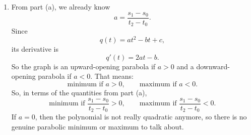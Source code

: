 \documentclass[10pt]{extarticle}
\begin{document}
\begin{enumerate}[label=(\alph*)]
\[\begin{array}{ccc|c}
t_1+t_0 & -1 & 0 & s_0\\[0.4em]
t_2+t_1 & -1 & 0 & s_1
\end{array}
\right).
\]
Now, subtract the second row from the third:
\[
R_3\leftarrow R_3-R_2.
\]
Then,
\[
\left(
\begin{array}{ccc|c}
t_0^2 & -t_0 & 1 & y_0\\
t_1+t_0 & -1 & 0 & s_0\\[0.4em]
t_2-t_0 & 0 & 0 & s_1-s_0
\end{array}
\right).
\]
Now, divide the third row by $t_2-t_0$:
\[
R_3\leftarrow \frac{1}{t_2-t_0}R_3.
\]
This gives
\[
\left(
\begin{array}{ccc|c}
t_0^2 & -t_0 & 1 & y_0\\
t_1+t_0 & -1 & 0 & s_0\\[0.4em]
1 & 0 & 0 & \dfrac{s_1-s_0}{t_2-t_0}
\end{array}
\right).
\]
So we can already read off
\[
a=\frac{s_1-s_0}{t_2-t_0}.
\]
Next, eliminate the $a$-entry from the second row:
\[
R_2\leftarrow R_2-(t_1+t_0)R_3.
\]
Then,
\[
\left(
\begin{array}{ccc|c}
t_0^2 & -t_0 & 1 & y_0\\
0 & -1 & 0 & s_0-(t_1+t_0)a\\[0.4em]
1 & 0 & 0 & a
\end{array}
\right).
\]
Finally, multiply the second row by $-1$:
\[
R_2\leftarrow -R_2,
\]
so
\[
\left(
\begin{array}{ccc|c}
t_0^2 & -t_0 & 1 & y_0\\
0 & 1 & 0 & (t_1+t_0)a-s_0\\[0.4em]
1 & 0 & 0 & a
\end{array}
\right).
\]
Thus,
\[
b=(t_1+t_0)a-s_0.
\]
If we let
\[
m_0=\frac{t_0+t_1}{2},
\qquad
m_1=\frac{t_1+t_2}{2},
\]
then this is the same as
\[
b=2am_0-s_0=2am_1-s_1.
\]
To get $c$, eliminate the $a$ and $b$ entries from the first row:
\[
R_1\leftarrow R_1-t_0^2R_3,
\qquad
R_1\leftarrow R_1+t_0R_2.
\]
This gives
\[
\left(
\begin{array}{ccc|c}
0 & 0 & 1 & y_0-t_0^2a+t_0b\\
0 & 1 & 0 & b\\
1 & 0 & 0 & a
\end{array}
\right),
\]
so
\[
c=y_0-t_0^2a+t_0b.
\]
Therefore, the coefficients are
\[
a=\frac{s_1-s_0}{t_2-t_0},
\qquad
b=2am_0-s_0,
\qquad
c=y_0-at_0^2+bt_0.
\]

\item From part (a), we already know
\[
a=\frac{s_1-s_0}{t_2-t_0}.
\]
Since
\[
q(t)=at^2-bt+c,
\]
its derivative is
\[
q'(t)=2at-b.
\]
So the graph is an upward-opening parabola if $a>0$ and a downward-opening parabola if $a<0$. That means:
\[
\text{minimum if } a>0,
\qquad
\text{maximum if } a<0.
\]
So, in terms of the quantities from part (a),
\[
\text{minimum if } \frac{s_1-s_0}{t_2-t_0}>0,
\qquad
\text{maximum if } \frac{s_1-s_0}{t_2-t_0}<0.
\]
If $a=0$, then the polynomial is not really quadratic anymore, so there is no genuine parabolic minimum or maximum to talk about.


\end{enumerate}
\end{document}
